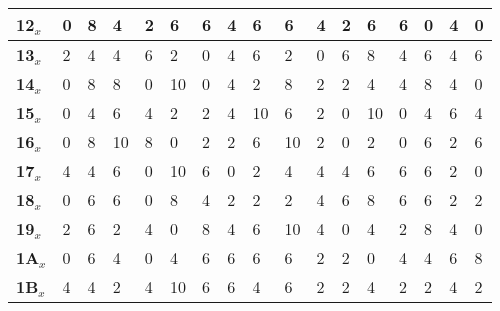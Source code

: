 \begin{longtable}[c]{|l|l|l|l|l|l|l|l|l|l|l|l|l|l|l|l|l|}
\textbf{12}$_x$ & 0          & 8          & 4          & 2          & 6          & 6          & 4          & 6          & 6          & 4          & 2          & 6          & 6          & 0          & 4          & 0          \\ \hline
\textbf{13}$_x$ & 2          & 4          & 4          & 6          & 2          & 0          & 4          & 6          & 2          & 0          & 6          & 8          & 4          & 6          & 4          & 6          \\ \hline
\textbf{14}$_x$ & 0          & 8          & 8          & 0          & 10         & 0          & 4          & 2          & 8          & 2          & 2          & 4          & 4          & 8          & 4          & 0          \\ \hline
\textbf{15}$_x$ & 0          & 4          & 6          & 4          & 2          & 2          & 4          & 10         & 6          & 2          & 0          & 10         & 0          & 4          & 6          & 4          \\ \hline
\textbf{16}$_x$ & 0          & 8          & 10         & 8          & 0          & 2          & 2          & 6          & 10         & 2          & 0          & 2          & 0          & 6          & 2          & 6          \\ \hline
\textbf{17}$_x$ & 4          & 4          & 6          & 0          & 10         & 6          & 0          & 2          & 4          & 4          & 4          & 6          & 6          & 6          & 2          & 0          \\ \hline
\textbf{18}$_x$ & 0          & 6          & 6          & 0          & 8          & 4          & 2          & 2          & 2          & 4          & 6          & 8          & 6          & 6          & 2          & 2          \\ \hline
\textbf{19}$_x$ & 2          & 6          & 2          & 4          & 0          & 8          & 4          & 6          & 10         & 4          & 0          & 4          & 2          & 8          & 4          & 0          \\ \hline
\textbf{1A}$_x$ & 0          & 6          & 4          & 0          & 4          & 6          & 6          & 6          & 6          & 2          & 2          & 0          & 4          & 4          & 6          & 8          \\ \hline
\textbf{1B}$_x$ & 4          & 4          & 2          & 4          & 10         & 6          & 6          & 4          & 6          & 2          & 2          & 4          & 2          & 2          & 4          & 2          \\ \hline

\end{longtable}

